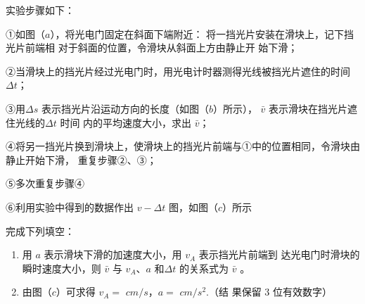 \begin{enumerate}
实验步骤如下：

①如图（$ a $），将光电门固定在斜面下端附近：
将一挡光片安装在滑块上，记下挡光片前端相
对于斜面的位置，令滑块从斜面上方由静止开
始下滑；


②当滑块上的挡光片经过光电门时，用光电计时器测得光线被挡光片遮住的时间$ \Delta t $；



③用$ \Delta s $ 表示挡光片沿运动方向的长度（如图（$ b $）所示）， $ \bar{v} $ 表示滑块在挡光片遮住光线的$ \Delta t $ 时间
内的平均速度大小，求出 $ \bar{v} $；

④将另一挡光片换到滑块上，使滑块上的挡光片前端与①中的位置相同，令滑块由静止开始下滑，
重复步骤②、③；


⑤多次重复步骤④

⑥利用实验中得到的数据作出 $ v- \Delta t $ 图，如图（$ c $）所示
\begin{figure}[h!]
\centering

\end{figure}

完成下列填空：
\begin{enumerate}
\renewcommand{\labelenumi}{\arabic{enumi}.}
\item
用 $ a $ 表示滑块下滑的加速度大小，用 $ v_{A} $ 表示挡光片前端到
达光电门时滑块的瞬时速度大小，则 $ \bar{v} $ 与 $ v_{A} $、$ a $ 和$ \Delta t $ 的关系式为
$ \bar{v} $  
。

\item 
由图（$ c $）可求得 $ v_{A} = $
$ cm/s $，$ a= $
$ cm/s^{2} $.（结
果保留 $ 3 $ 位有效数字）

\end{enumerate}







\end{enumerate}

